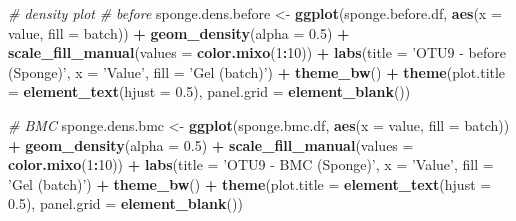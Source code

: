 \documentclass[]{book}
\newenvironment{Shaded}{\begin{snugshade}}{\end{snugshade}}
\newcommand{\KeywordTok}[1]{\textcolor[rgb]{0.13,0.29,0.53}{\textbf{#1}}}
\newcommand{\DataTypeTok}[1]{\textcolor[rgb]{0.13,0.29,0.53}{#1}}
\newcommand{\DecValTok}[1]{\textcolor[rgb]{0.00,0.00,0.81}{#1}}
\newcommand{\FloatTok}[1]{\textcolor[rgb]{0.00,0.00,0.81}{#1}}
\newcommand{\StringTok}[1]{\textcolor[rgb]{0.31,0.60,0.02}{#1}}
\newcommand{\CommentTok}[1]{\textcolor[rgb]{0.56,0.35,0.01}{\textit{#1}}}
\newcommand{\OperatorTok}[1]{\textcolor[rgb]{0.81,0.36,0.00}{\textbf{#1}}}
\newcommand{\NormalTok}[1]{#1}
\begin{document}
\begin{Shaded}
\begin{Highlighting}[]
\CommentTok{# density plot}
\CommentTok{# before}
\NormalTok{sponge.dens.before <-}\StringTok{ }\KeywordTok{ggplot}\NormalTok{(sponge.before.df, }\KeywordTok{aes}\NormalTok{(}\DataTypeTok{x =}\NormalTok{ value, }\DataTypeTok{fill =}\NormalTok{ batch)) }\OperatorTok{+}\StringTok{ }
\StringTok{  }\KeywordTok{geom_density}\NormalTok{(}\DataTypeTok{alpha =} \FloatTok{0.5}\NormalTok{) }\OperatorTok{+}\StringTok{ }\KeywordTok{scale_fill_manual}\NormalTok{(}\DataTypeTok{values =} \KeywordTok{color.mixo}\NormalTok{(}\DecValTok{1}\OperatorTok{:}\DecValTok{10}\NormalTok{)) }\OperatorTok{+}\StringTok{ }
\StringTok{  }\KeywordTok{labs}\NormalTok{(}\DataTypeTok{title =} \StringTok{'OTU9 - before (Sponge)'}\NormalTok{, }\DataTypeTok{x =} \StringTok{'Value'}\NormalTok{, }\DataTypeTok{fill =} \StringTok{'Gel (batch)'}\NormalTok{) }\OperatorTok{+}\StringTok{ }
\StringTok{  }\KeywordTok{theme_bw}\NormalTok{() }\OperatorTok{+}\StringTok{ }\KeywordTok{theme}\NormalTok{(}\DataTypeTok{plot.title =} \KeywordTok{element_text}\NormalTok{(}\DataTypeTok{hjust =} \FloatTok{0.5}\NormalTok{), }
                     \DataTypeTok{panel.grid =} \KeywordTok{element_blank}\NormalTok{())}

\CommentTok{# BMC}
\NormalTok{sponge.dens.bmc <-}\StringTok{ }\KeywordTok{ggplot}\NormalTok{(sponge.bmc.df, }\KeywordTok{aes}\NormalTok{(}\DataTypeTok{x =}\NormalTok{ value, }\DataTypeTok{fill =}\NormalTok{ batch)) }\OperatorTok{+}\StringTok{ }
\StringTok{  }\KeywordTok{geom_density}\NormalTok{(}\DataTypeTok{alpha =} \FloatTok{0.5}\NormalTok{) }\OperatorTok{+}\StringTok{ }\KeywordTok{scale_fill_manual}\NormalTok{(}\DataTypeTok{values =} \KeywordTok{color.mixo}\NormalTok{(}\DecValTok{1}\OperatorTok{:}\DecValTok{10}\NormalTok{)) }\OperatorTok{+}\StringTok{ }
\StringTok{  }\KeywordTok{labs}\NormalTok{(}\DataTypeTok{title =} \StringTok{'OTU9 - BMC (Sponge)'}\NormalTok{, }\DataTypeTok{x =} \StringTok{'Value'}\NormalTok{, }\DataTypeTok{fill =} \StringTok{'Gel (batch)'}\NormalTok{) }\OperatorTok{+}\StringTok{ }
\StringTok{  }\KeywordTok{theme_bw}\NormalTok{() }\OperatorTok{+}\StringTok{ }\KeywordTok{theme}\NormalTok{(}\DataTypeTok{plot.title =} \KeywordTok{element_text}\NormalTok{(}\DataTypeTok{hjust =} \FloatTok{0.5}\NormalTok{), }
                     \DataTypeTok{panel.grid =} \KeywordTok{element_blank}\NormalTok{())}



\end{Highlighting}
\end{Shaded}
\end{document}
